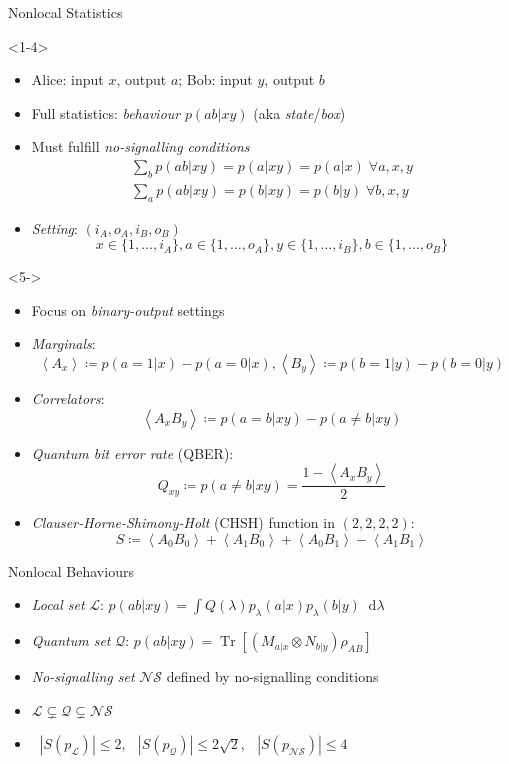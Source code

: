 \documentclass[xcolor=dvipsnames]{beamer}
\newcommand{\abs}[1]{\mathop{}\left\lvert#1\right\rvert}
\newcommand{\dif}{\mathop{}\!\mathrm{d}} %
\newcommand{\dintv}[2]{\mathopen\{#1,\ldots,#2\mathclose\}}
\newcommand{\?}{\mathrel{?}} %
\newcommand{\angleb}[1]{\left\langle #1 \right\rangle} %
\newcommand{\Tr}[2][]{\mathop{\mathrm{Tr}#1}\left[ #2 \right]} %
\newcommand{\Ls}{\mathcal{L}}
\newcommand{\Qs}{\mathcal{Q}}
\newcommand{\NSs}{\mathcal{NS}}
\begin{document}
\begin{frame}{Nonlocal Statistics}
  \begin{onlyenv}<1-4>
  \begin{itemize}[<+->]
    \item Alice: input \(x\), output \(a\); Bob: input \(y\), output \(b\)
    \item Full statistics: \emph{behaviour} \(p(ab|xy)\) (aka \emph{state}/\emph{box})
    \item Must fulfill \emph{no-signalling conditions}
      \begin{gather*}
        \sum_b p(ab|xy) = p(a|xy) = p(a|x)\;\forall a,x,y \\
        \sum_a p(ab|xy) = p(b|xy) = p(b|y)\;\forall b,x,y
      \end{gather*}
    \item \emph{Setting}: \((i_A, o_A, i_B, o_B)\)
    \[ x \in \dintv{1}{i_A}, a \in \dintv{1}{o_A}, y \in \dintv{1}{i_B}, b \in \dintv{1}{o_B} \]
  \end{itemize}
  \end{onlyenv}
  \begin{onlyenv}<5->
  \begin{itemize}[<+->]
    \item Focus on \emph{binary-output} settings
    \item \emph{Marginals}:
      \[ \angleb{A_x} \coloneqq p(a=1|x) - p(a=0|x), \angleb{B_y} \coloneqq p(b=1|y) - p(b=0|y) \]
    \item \emph{Correlators}:
      \[ \angleb{A_x B_y} \coloneqq p(a=b|xy) - p(a\neq b|xy) \]
    \item \emph{Quantum bit error rate} (QBER):
      \[ Q_{xy} \coloneqq p(a \neq b|xy) = \frac{1-\angleb{A_x B_y}}{2} \]
    \item \emph{Clauser-Horne-Shimony-Holt} (CHSH) function in \((2,2,2,2)\):
      \[ S \coloneqq \angleb{A_0 B_0} + \angleb{A_1 B_0} + \angleb{A_0 B_1} - \angleb{A_1 B_1} \]
  \end{itemize}
  \end{onlyenv}
\end{frame}

\begin{frame}{Nonlocal Behaviours}
  \begin{itemize}[<+->]
    \item \emph{Local set} \(\Ls\): \(p(ab|xy) = \int Q(\lambda) p_{\lambda}(a|x)p_{\lambda}(b|y) \dif{\lambda} \)
    \item \emph{Quantum set} \(\Qs\): \(p(ab|xy) = \Tr{ \left(M_{a|x} \otimes N_{b|y}\right) \rho_{AB} }\)
    \item \emph{No-signalling set} \(\NSs\) defined by no-signalling conditions
    \item \(\Ls \subsetneq \Qs \subsetneq \NSs\)
    \item \(\abs{S(p_{\Ls})} \leq 2\), \(\abs{S(p_{\Qs})} \leq 2\sqrt{2}\), \(\abs{S(p_{\NSs})} \leq 4\)
  \end{itemize}
\end{frame}
\end{document}
